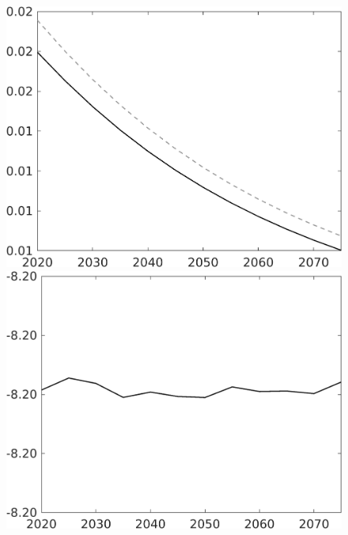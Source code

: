 \documentclass[12pt]{article}
\begin{document}
\begin{figure}
\begin{minipage}[]{0.32\textwidth}
\end{minipage}	
\begin{minipage}[]{0.32\textwidth}
	\includegraphics[width=1\textwidth]{../../codding_model/own_basedOnFried/optimalPol_010922_revision/figures/all_13Sept22/CompTaul_Equlab_LFBAU_Reg0_wsg_spillover0_nsk1_xgr0_knspil1_sep1_countec0_GovRev0_etaa0.79_lgd0.png}
\end{minipage}	
\begin{minipage}[]{0.32\textwidth}
\includegraphics[width=1\textwidth]{../../codding_model/own_basedOnFried/optimalPol_010922_revision/figures/all_13Sept22/CompTaul_Equlab_LFBAUPer_Reg0_wsn_spillover0_nsk1_xgr0_knspil1_sep1_countec0_GovRev0_etaa0.79.png}

\end{minipage}
\end{figure}
\end{document}
